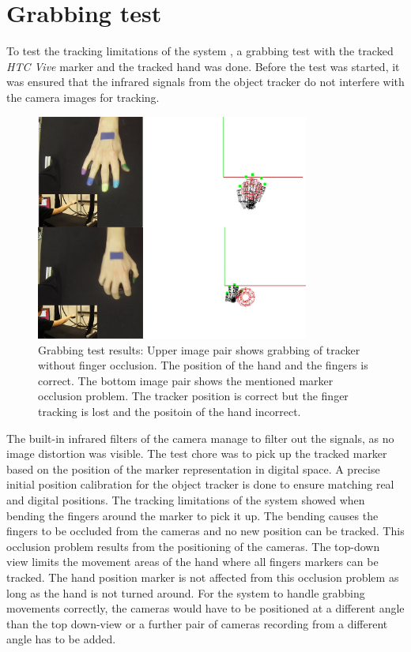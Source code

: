 \section{Grabbing test}
To test the tracking limitations of the system , a grabbing test with the tracked \textit{HTC Vive} marker and the tracked hand was done.
Before the test was started, it was ensured that the infrared signals from the object tracker do not interfere with the camera images for tracking. 
\begin{figure}[H]
\centering
\includegraphics[width=0.8\textwidth]{images/occlusion_set.jpg}
\caption{Grabbing test results: Upper image pair shows grabbing of tracker without finger occlusion. The position of the hand and the fingers is correct. The bottom image pair shows the mentioned marker occlusion problem. The tracker  position is correct but the finger tracking is lost and the positoin of the hand incorrect.}
\label{img:hand_rendering}
\end{figure}
The built-in infrared filters of the camera manage to filter out the signals, as no image distortion was visible. The test chore was to pick up the tracked marker based on the position of the marker representation in digital space.
A precise initial position calibration for the object tracker is done to ensure matching real and digital positions. The tracking limitations of the system showed when bending the fingers around the marker to pick it up. The bending causes the fingers to be occluded from the cameras and no new position can be tracked. This occlusion problem results from the positioning of the cameras. The top-down view limits the movement areas of the hand where all fingers markers can be tracked. The hand position marker is not affected from this occlusion problem as long as the hand is not turned around.
For the system to handle grabbing movements correctly, the cameras would have to be positioned at a different angle than the top down-view or a further pair of cameras recording from a different angle has to be added.
